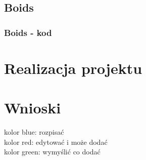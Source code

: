 \documentclass[a4paper,12pt,reqno]{article}
\begin{document}
\subsection{Boids}
\subsubsection{Boids - kod}





\section{Realizacja projektu}

\section{Wnioski}


\newpage




{\color{blue} kolor blue: rozpisać}\\
{\color{red} kolor red: edytować i może dodać}\\
{\color{green} kolor green: wymyślić co dodać}
\end{document}
